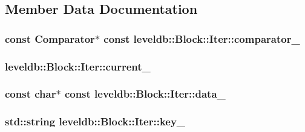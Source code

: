 \subsection{Member Data Documentation}
\hypertarget{classleveldb_1_1_block_1_1_iter_a8d6a7b92f8871936961f03339f4f0599}{
\subsubsection[{comparator\-\_\-}]{\setlength{\rightskip}{0pt plus 5cm}const {\bf Comparator}$\ast$ const leveldb\-::\-Block\-::\-Iter\-::comparator\-\_\-\hspace{0.3cm}{\ttfamily [private]}}}\label{classleveldb_1_1_block_1_1_iter_a8d6a7b92f8871936961f03339f4f0599}
\hypertarget{classleveldb_1_1_block_1_1_iter_a138761b9a17e914cb938458231ea6420}{
\subsubsection[{current\-\_\-}]{ leveldb\-::\-Block\-::\-Iter\-::current\-\_\-\hspace{0.3cm}{\ttfamily [private]}}}\label{classleveldb_1_1_block_1_1_iter_a138761b9a17e914cb938458231ea6420}
\hypertarget{classleveldb_1_1_block_1_1_iter_a1c59db8f5db56e150aa59c43d8cb1976}{
\subsubsection[{data\-\_\-}]{\setlength{\rightskip}{0pt plus 5cm}const char$\ast$ const leveldb\-::\-Block\-::\-Iter\-::data\-\_\-\hspace{0.3cm}{\ttfamily [private]}}}\label{classleveldb_1_1_block_1_1_iter_a1c59db8f5db56e150aa59c43d8cb1976}
\hypertarget{classleveldb_1_1_block_1_1_iter_a81757de8bc5414ccfe859e7387bee406}{
\subsubsection[{key\-\_\-}]{\setlength{\rightskip}{0pt plus 5cm}std\-::string leveldb\-::\-Block\-::\-Iter\-::key\-\_\-\hspace{0.3cm}{\ttfamily [private]}}}\label{classleveldb_1_1_block_1_1_iter_a81757de8bc5414ccfe859e7387bee406}
